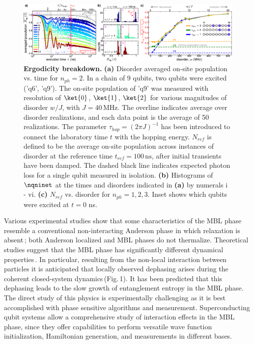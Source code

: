 \begin{figure}[t] %
\centering
\includegraphics[width=178mm]{./PDF/fig_2.pdf}
\caption{
\textbf{Ergodicity breakdown.} \textbf{(a)} Disorder averaged on-site population vs. time for $n_{ph}=2$. In a chain of 9 qubits, two qubits were excited ('q6', 'q9'). The on-site population of 'q9' was measured with resolution of $\ket{0}$, $\ket{1}$, $\ket{2}$ for various magnitudes of disorder $w/J$, with $J=40\,\text{MHz}$. The overline indicates average over disorder realizations, and each data point is the average of 50 realizations. The parameter $\tau_{hop}=\left(2 \pi J \right)^{-1}$ has been introduced to connect the laboratory time $t$ with the hopping energy. $N_{ref}$ is defined to be the average on-site population across instances of disorder at the reference time $t_{ref}=100\,\text{ns}$, after initial transients have been damped. The dashed black line indicates expected photon loss for a single qubit measured in isolation. \textbf{(b)} Histograms of $\nqninet$  at the times and disorders indicated in \textbf{(a)} by numerals i - vi. \textbf{(c)} $N_{ref}$ vs. disorder for $n_{ph}=1, 2, 3$. Inset shows which qubits were excited at $t=0$ ns.}
\vspace{-1em}
\end{figure}

Various experimental studies show that some characteristics of the MBL phase resemble a conventional non-interacting Anderson phase in which relaxation is absent\,\cite{BlochMBL2015, demarco2015, Monroe2015, GrossScience2016, Bordia2017, Roushan2018, Lukin2019}; both Anderson localized and MBL phases do not thermalize. Theoretical studies suggest that the MBL phase has significantly different dynamical properties\,\cite{Huse2007, Bardarson2012, Serbyn2013b, Huse2014, Serbyn2013, KnapPRL2014, Antonello2017, Serbyn2014, Yasaman2015,  Gopalakrishnan2015, Serbyn2015, Altman2015, ImbriePRL2016}. In particular, resulting from the non-local interaction between particles it is anticipated that locally observed dephasing arises during the coherent closed-system dynamics\,(Fig.\,1). It has been predicted that this dephasing leads to the slow growth of entanglement entropy in the MBL phase. The direct study of this physics is experimentally challenging as it is best accomplished with phase sensitive algorithms and measurement. Superconducting qubit systems allow a comprehensive study of interaction effects in the MBL phase, since they offer capabilities to perform versatile wave function initialization, Hamiltonian generation, and measurements in different bases.

